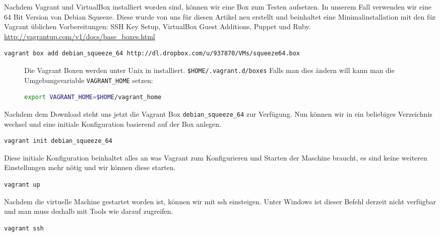 \documentclass[12pt,a4paper,ngerman]{article}
\begin{document}
Nachdem Vagrant und VirtualBox installiert worden sind, können wir eine Box zum Testen aufsetzen. In unserem Fall verwenden wir eine 64 Bit Version von Debian Squeeze. Diese wurde von uns für diesen Artikel neu erstellt und beinhaltet eine Minimalinstallation mit den für Vagrant üblichen Vorbereitungen: SSH Key Setup, VirtualBox Guest Additions, Puppet und Ruby. \url{http://vagrantup.com/v1/docs/base_boxes.html}

\begin{lstlisting}[language=sh,caption=Download der Vagrant Box, label=vagrant-add]
vagrant box add debian_squeeze_64 http://dl.dropbox.com/u/937870/VMs/squeeze64.box
\end{lstlisting}

\begin{figure}
\vspace{-20pt}
\begin{boxedminipage}{4.5cm}
 Die Vagrant Boxen werden unter Unix in installiert. \lstinline!$HOME/.vagrant.d/boxes!
Falls man dies ändern will kann man die Umgebungsvariable \lstinline$VAGRANT_HOME$ setzen:
\begin{lstlisting}[language=sh,label=vagrant-home,frame=none,numbers=none]
export VAGRANT_HOME=$HOME/vagrant_home
\end{lstlisting}
\end{boxedminipage}
\vspace{-20pt}
\end{figure}
 

Nachdem dem Download steht uns jetzt die  Vagrant Box \lstinline$debian_squeeze_64$ zur Verfügung. Nun können wir in ein beliebiges Verzeichnis wechsel und eine initiale Konfiguration basierend auf der Box anlegen.

\begin{lstlisting}[language=sh,caption=Vagrant initialisieren, label=vagrant-init]
vagrant init debian_squeeze_64
\end{lstlisting}

Diese initiale Konfiguration beinhaltet alles an was Vagrant zum Konfigurieren und Starten der Maschine braucht, es sind keine weiteren Einstellungen mehr nötig und wir können diese starten.

\begin{lstlisting}[language=sh,caption=Starten der Vagrant Maschine, label=vagrant-up]
vagrant up
\end{lstlisting}

Nachdem die virtuelle Machine gestartet worden ist, können wir mit ssh einsteigen. Unter Windows ist dieser Befehl derzeit nicht verfügbar und man muss deshalb mit Tools wie \cite{putty} darauf zugreifen.
\begin{lstlisting}[language=sh,caption=Mit ssh in der Vagrant Maschine einsteigen, label=vagrant-ssh]
vagrant ssh
\end{lstlisting}
 
\end{document}
